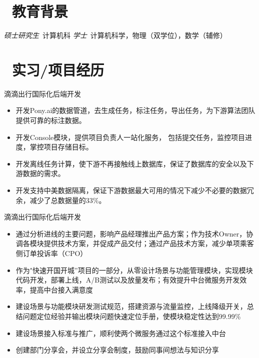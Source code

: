 \documentclass{resume}
\begin{document}


 
\section{\faGraduationCap\  教育背景}
\textit{硕士研究生}\ 计算机科
\textit{学士}\ 计算机科学，物理（双学位），数学（辅修）

\section{\faUsers\ 实习/项目经历}
\role{软件开发工程师}{工作经历}
滴滴出行国际化后端开发
\begin{itemize}
  \item 开发Pony.ai的数据管道，去生成任务，标注任务，导出任务，为下游算法团队提供可靠的标注数据。
  \item 开发Console模块，提供项目负责人一站化服务， 包括提交任务，监控项目进度，掌控项目存储目标。
  \item 开发离线任务计算，使下游不再接触线上数据库，保证了数据库的安全以及下游数据的需求。
  \item 开发支持中美数据隔离，保证下游数据最大可用的情况下减少不必要的数据冗余，减少了总数据量的33\%。
\end{itemize}

滴滴出行国际化后端开发
\begin{itemize}
  \item 通过分析进线的主要问题，影响产品经理推出产品方案；作为技术Owner，协调各模块提供技术方案，并促成产品交付；通过产品技术方案，减少单项乘客侧订单投诉率（CPO）
  \item 作为"快速开国开城”项目的一部分，从零设计场景与功能管理模块，实现模块代码开发，部署上线，A/B测试以及放量发布；有效提升中台微服务开发效率，提高中台接入满意度
  \item 建设场景与功能模块研发测试规范，搭建资源与流量监控，上线降级开关，总结问题定位经验并输出模块问题快速定位手册，使模块稳定性达到99.99\%
  \item 建设场景接入标准与推广，顺利使两个微服务通过这个标准接入中台
  \item 创建部门分享会，并设立分享会制度，鼓励同事间想法与知识分享
\end{itemize}
\end{document}
